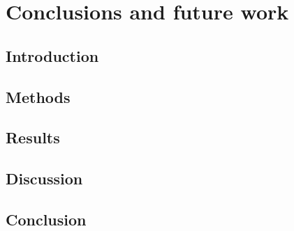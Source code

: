 \chapter{Conclusions and future work}

\section{Introduction}

\section{Methods}

\section{Results}

\section{Discussion}

\section{Conclusion}